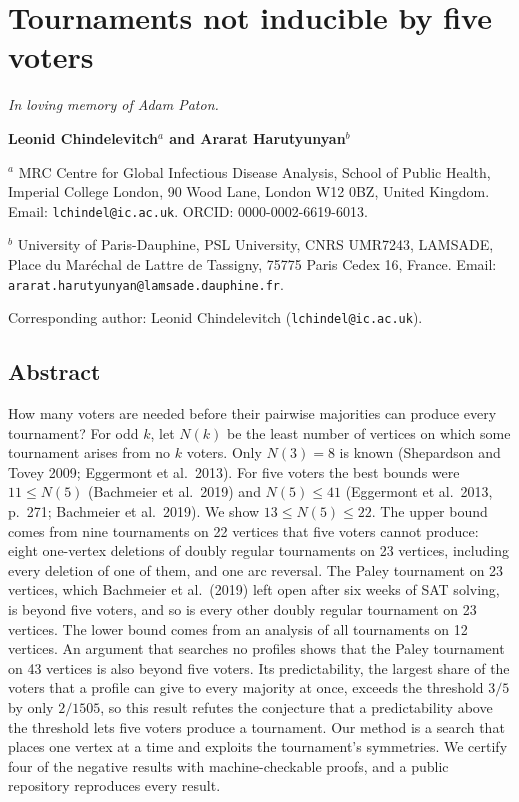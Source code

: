 \documentclass[
]{article}
\author{}
\date{\vspace{-2.5em}}
\begin{document}
\newcommand{\XrefCheck}[2]{\begingroup\edef\XrefGot{\csname the#1\endcsname}\edef\XrefWant{#2}\ifx\XrefGot\XrefWant\else\errmessage{xref.lua: LaTeX numbered this #1 \XrefGot, the filter numbered it #2}\fi\endgroup}

\section{Tournaments not inducible by five
voters}\label{tournaments-not-inducible-by-five-voters}

\emph{In loving memory of Adam Paton.}

\textbf{Leonid Chindelevitch\(^{a}\) and Ararat Harutyunyan\(^{b}\)}

\(^{a}\) MRC Centre for Global Infectious Disease Analysis, School of
Public Health, Imperial College London, 90 Wood Lane, London W12 0BZ,
United Kingdom. Email: \texttt{lchindel@ic.ac.uk}. ORCID:
0000-0002-6619-6013.

\(^{b}\) University of Paris-Dauphine, PSL University, CNRS UMR7243,
LAMSADE, Place du Maréchal de Lattre de Tassigny, 75775 Paris Cedex 16,
France. Email: \texttt{ararat.harutyunyan@lamsade.dauphine.fr}.

Corresponding author: Leonid Chindelevitch (\texttt{lchindel@ic.ac.uk}).

\subsection{Abstract}\label{abstract}

How many voters are needed before their pairwise majorities can produce
every tournament? For odd \(k\), let \(N(k)\) be the least number of
vertices on which some tournament arises from no \(k\) voters. Only
\(N(3) = 8\) is known (Shepardson and Tovey 2009; Eggermont et
al.~2013). For five voters the best bounds were \(11 \le N(5)\)
(Bachmeier et al.~2019) and \(N(5) \le 41\) (Eggermont et al.~2013,
p.~271; Bachmeier et al.~2019). We show \(13 \le N(5) \le 22\). The
upper bound comes from nine tournaments on 22 vertices that five voters
cannot produce: eight one-vertex deletions of doubly regular tournaments
on 23 vertices, including every deletion of one of them, and one arc
reversal. The Paley tournament on 23 vertices, which Bachmeier et
al.~(2019) left open after six weeks of SAT solving, is beyond five
voters, and so is every other doubly regular tournament on 23 vertices.
The lower bound comes from an analysis of all tournaments on 12
vertices. An argument that searches no profiles shows that the Paley
tournament on 43 vertices is also beyond five voters. Its
predictability, the largest share of the voters that a profile can give
to every majority at once, exceeds the threshold \(3/5\) by only
\(2/1505\), so this result refutes the conjecture that a predictability
above the threshold lets five voters produce a tournament. Our method is
a search that places one vertex at a time and exploits the tournament's
symmetries. We certify four of the negative results with
machine-checkable proofs, and a public repository reproduces every
result.
\end{document}

